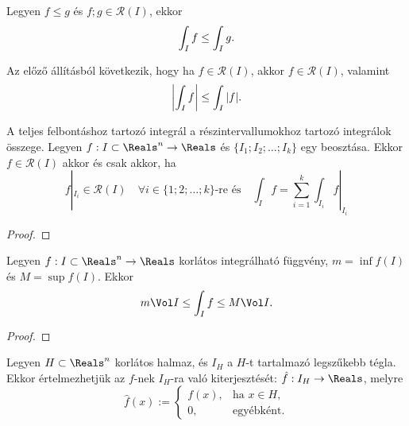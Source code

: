 \begin{statement}
  Legyen $f \leq g$ és $f; g \in \mathcal R(I)$, ekkor
  $$
    \int_I f \leq \int_I g
    \text.
  $$
\end{statement}

\begin{note}
  Az előző állításból következik, hogy ha $f \in \mathcal R(I)$, akkor
  $f \in \mathcal R(I)$, valamint
  $$
    \left| \int_I f \right| \leq \int_I |f|
    \text.
  $$
\end{note}

\begin{statement}
  A teljes felbontáshoz tartozó integrál a részintervallumokhoz tartozó
  integrálok összege. Legyen $f: I \subset \Reals^n \to \Reals$ és
  $\{ I_1; I_2; \ldots; I_k \}$ egy beosztása. Ekkor $f \in \mathcal R(I)$
  akkor és csak akkor, ha
  $$
    f|_{I_i} \in \mathcal R(I)
    \quad
    \forall i \in \{1; 2; \ldots; k\}
    \text{-re és}
    \quad
    \int_I f = \sum_{i = 1}^k \int_{I_i} f|_{I_i}
  $$

  \begin{proof}
    \vspace{8em}
  \end{proof}
\end{statement}

\begin{theorem}[Középértéktétel]
  Legyen $f: I \subset \Reals^n \to \Reals$ korlátos integrálható függvény,
  $m = \inf f(I)$ és $M = \sup f(I)$. Ekkor
  $$
    m \Vol I \leq \int_I f \leq M \Vol I
    \text.
  $$

  \begin{proof}
    \vspace{8em}
  \end{proof}
\end{theorem}

\begin{definition}
  Legyen $H \subset \Reals^n$ korlátos halmaz, és $I_H$ a $H$-t tartalmazó
  legszűkebb tégla. Ekkor értelmezhetjük az $f$-nek $I_H$-ra való
  kiterjesztését: $\hat f: I_H \to \Reals$, melyre
  $$
    \hat f(x) :=
    \begin{cases}
      f(x), & \text{ha } x \in H \text{,} \\
      0,    & \text{egyébként.}
    \end{cases}
  $$
\end{definition}

